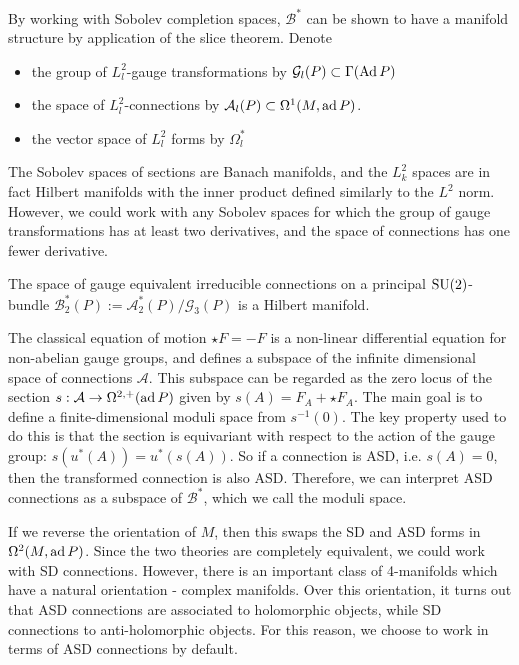 By working with Sobolev completion
spaces, $\mathcal{B}^*$ can be shown to have a manifold structure by 
application of the slice theorem. Denote
\begin{itemize}
	\item the group of $L^2_l$-gauge transformations by $\mathcal{G}_l(P) \subset
\Gamma(\operatorname{Ad} P)$ 
	\item the space of $L^2_l$-connections by $\mathcal{A}_l(P) \subset
\Omega^1(M,\operatorname{ad} P)$. 
	\item the vector space of $L^2_l$ forms by  $\Omega^*_{l}$
\end{itemize}
The Sobolev spaces of sections are Banach manifolds, and 
the $L^2_k$ spaces are in fact Hilbert manifolds with the inner product defined
similarly to the $L^2$ norm. However, we could work with
any Sobolev spaces for which the group of gauge transformations has at least two
derivatives, and the space of connections has one fewer derivative. 

\begin{thm} 
	The space of gauge equivalent irreducible connections
    on a principal $\operatorname{SU}(2)$-bundle
	$\mathcal{B}^*_2(P) := \mathcal{A}^*_2(P) / \mathcal{G}_3(P)$ is a 
	Hilbert manifold. 
\end{thm}

The classical equation of motion $\star F = - F$ is a non-linear differential equation for
non-abelian gauge groups, and defines a subspace of the infinite dimensional
space of connections $\mathcal{A}$. This subspace can be regarded as the zero
locus of the section $s : \mathcal{A} \to \Omega^{2,+}(\operatorname{ad} P)$ given by $s(A) =
F_A+\star F_A$. The main goal is to define a finite-dimensional moduli space
from  $s^{-1}(0)$. 
The key property used to do this is that the section is equivariant with respect
to the action of the gauge group: $s(u^*(A))=u^*(s(A))$. 
So if a connection is ASD, i.e. $s(A)=0$, then the transformed connection is
also ASD. Therefore, we can interpret ASD connections as a subspace of 
$\mathcal{B}^*$, which we call the moduli space.


\begin{remark}
If we reverse the orientation of $M$, then this swaps the SD and ASD forms in
$\Omega^2(M,\operatorname{ad} P)$. Since the two theories are completely
equivalent, we could work with SD connections. However, there is an
important class of 4-manifolds which have a natural orientation - complex
manifolds. Over this orientation, it turns out that ASD connections are 
associated to holomorphic objects, while SD connections to anti-holomorphic
objects.\cite[p.95]{morgan} For this reason, we choose to work in terms of 
ASD connections by default.
\end{remark}

